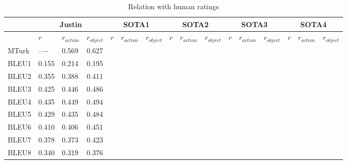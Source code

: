 \documentclass[journal,comsoc]{IEEEtran}
\begin{document}
\begin{table*}[]
\centering
\caption{Relation with human ratings}
\setlength{\tabcolsep}{1mm}
\label{tab:rating_relation}
\begin{tabular}{l|lll|lll|lll|lll|lll}
\hline
        & \multicolumn{3}{c|}{Justin} & \multicolumn{3}{c|}{SOTA1} & \multicolumn{3}{c|}{SOTA2} & \multicolumn{3}{c|}{SOTA3} & \multicolumn{3}{c}{SOTA4} \\ \hline
        & $r$      & $r_{action}$      & $r_{object}$      & $r$     & $r_{action}$      & $r_{object}$      & $r$      & $r_{action}$     & $r_{object}$     & $r$      & $r_{action}$     & $r_{object}$      & $r$      & $r_{action}$      & $r_{object}$      \\ \hline
MTurk   &  ----       &  0.569       &  0.627      &        &         &        &        &         &        &        &         &        &        &         &        \\
BLEU1   &  0.155      &  0.214       &  0.195       &        &         &        &        &         &        &        &         &        &        &         &        \\
BLEU2   &  0.355      & 0.388        &  0.411       &        &         &        &        &         &        &        &         &        &        &         &        \\
BLEU3   &  0.425      & 0.446        &  0.486       &        &         &        &        &         &        &        &         &        &        &         &        \\
BLEU4   &  0.435      & 0.449        &  0.494       &        &         &        &        &         &        &        &         &        &        &         &        \\
BLEU5   &  0.429      & 0.435        &  0.484       &        &         &        &        &         &        &        &         &        &        &         &        \\
BLEU6   &  0.410      & 0.406        &  0.451       &        &         &        &        &         &        &        &         &        &        &         &        \\
BLEU7   &  0.378      & 0.373        &  0.423       &        &         &        &        &         &        &        &         &        &        &         &        \\
BLEU8   &  0.340      & 0.319        &  0.376       &        &         &        &        &         &        &        &         &        &        &         &        \\

\end{tabular}
\end{table*}
\end{document}
